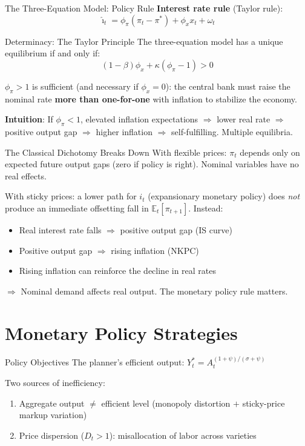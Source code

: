 \documentclass[blue]{beamer}
\newcommand{\E}{\mathbb{E}}
\begin{document}
\begin{frame}{The Three-Equation Model: Policy Rule}
\textbf{Interest rate rule} (Taylor rule):
\[
\hat{\imath}_t = \phi_\pi(\pi_t - \pi^*) + \phi_x x_t + \omega_t
\]
\end{frame}

\begin{frame}{Determinacy: The Taylor Principle}
The three-equation model has a unique equilibrium if and only if:
\[
(1-\beta)\phi_x + \kappa(\phi_\pi - 1) > 0
\]

$\phi_\pi > 1$ is sufficient (and necessary if $\phi_x = 0$): the central bank must raise the nominal rate \textbf{more than one-for-one} with inflation to stabilize the economy.

\bigskip
\textbf{Intuition}: If $\phi_\pi < 1$, elevated inflation expectations $\Rightarrow$ lower real rate $\Rightarrow$ positive output gap $\Rightarrow$ higher inflation $\Rightarrow$ self-fulfilling. Multiple equilibria.
\end{frame}

\begin{frame}{The Classical Dichotomy Breaks Down}
With flexible prices: $\pi_t$ depends only on expected future output gaps (zero if policy is right). Nominal variables have no real effects.

\bigskip
With sticky prices: a lower path for $i_t$ (expansionary monetary policy) does \emph{not} produce an immediate offsetting fall in $\E_t[\pi_{t+1}]$. Instead:
\begin{itemize}
    \item Real interest rate falls $\Rightarrow$ positive output gap (IS curve)
    \item Positive output gap $\Rightarrow$ rising inflation (NKPC)
    \item Rising inflation can reinforce the decline in real rates
\end{itemize}

\bigskip
$\Rightarrow$ Nominal demand affects real output. The monetary policy rule matters.
\end{frame}

\section{Monetary Policy Strategies}

\begin{frame}{Policy Objectives}
The planner's efficient output: $Y_t^* = A_t^{(1+\psi)/(\sigma+\psi)}$

\bigskip
Two sources of inefficiency:
\begin{enumerate}
    \item Aggregate output $\neq$ efficient level (monopoly distortion $+$ sticky-price markup variation)
    \item Price dispersion ($D_t > 1$): misallocation of labor across varieties
\end{enumerate}

\bigskip
\end{frame}
\end{document}
